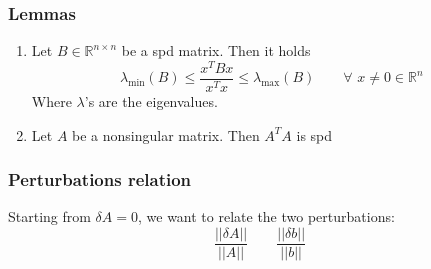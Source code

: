 \subsubsection{Lemmas}
\begin{enumerate}[1)]
    \item Let $B\in\mathbb{R}^{n\times n}$ be a spd matrix. Then it holds
    $$
    \lambda_{\min}(B)\leq\frac{x^TBx}{x^Tx}\leq\lambda_{\max}(B)\qquad\forall\,\,x\neq 0\in\mathbb{R}^n
    $$
    Where $\lambda$'s are the eigenvalues.
    \item Let $A$ be a nonsingular matrix. Then $A^TA$ is spd
\end{enumerate}

\subsubsection{Perturbations relation}
Starting from $\delta A=0$, we want to relate the two perturbations:
$$\frac{||\delta A||}{||A||}\qquad\frac{||\delta b||}{||b||}$$
